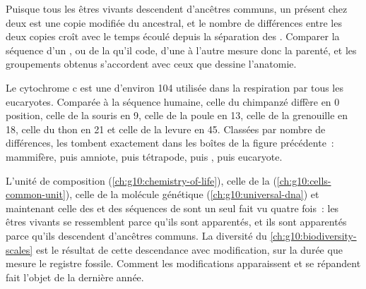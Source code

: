 \begin{proposition}\label{prop:g10:common-ancestry:molecular}
Puisque tous les êtres vivants descendent d'ancêtres communs, un 
présent chez deux  est une copie modifiée du  ancestral, et
le nombre de différences entre les deux copies croît avec le temps
écoulé depuis la séparation des . Comparer la séquence d'un ,
ou de la  qu'il code, d'une  à l'autre mesure donc la
parenté, et les groupements obtenus s'accordent avec ceux que dessine
l'anatomie.
\end{proposition}
\admitted

\begin{example}[Le cytochrome c]\label{ex:g10:common-ancestry:cytochrome}
Le cytochrome c est une  d'environ 104  utilisée
dans la respiration par tous les eucaryotes. Comparée à la séquence
humaine, celle du chimpanzé diffère en 0 position, celle de la souris
en 9, celle de la poule en 13, celle de la grenouille en 18, celle du
thon en 21 et celle de la levure en 45. Classées par nombre de
différences, les  tombent exactement dans les boîtes de la
figure précédente~: mammifère, puis amniote, puis tétrapode, puis
, puis eucaryote.
\end{example}

\begin{remark}\label{rem:g10:common-ancestry:unity}
L'unité de composition (\cref{ch:g10:chemistry-of-life}), celle de la
 (\cref{ch:g10:cells-common-unit}), celle de la molécule
génétique (\cref{ch:g10:universal-dna}) et maintenant celle des  et des séquences de  sont un seul fait vu quatre
fois~: les êtres vivants se ressemblent parce qu'ils sont apparentés,
et ils sont apparentés parce qu'ils descendent d'ancêtres communs. La
diversité du \cref{ch:g10:biodiversity-scales} est le résultat de cette
descendance avec modification, sur la durée que mesure le registre
fossile. Comment les modifications apparaissent et se répandent fait
l'objet de la dernière année.
\end{remark}


